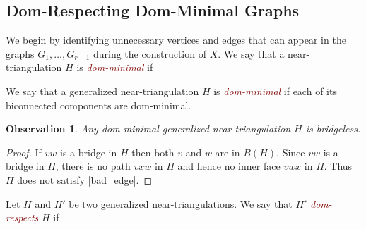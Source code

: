 \documentclass[a4paper,UKenglish,cleveref, autoref, thm-restate]{lipics-v2021}
\newtheorem{obs}{Observation}
\newcommand{\defin}[1]{\emph{\textcolor{Maroon}{#1}}}
\newcommand{\pat}[1]{[\textcolor{red}{PM: #1}]}
\newcommand{\saeed}[1]{[{\color{blue}SO: #1}]}
\begin{document}


\subsection{Dom-Respecting Dom-Minimal Graphs}

We begin by identifying unnecessary vertices and edges that can appear in the graphs $G_1,\ldots,G_{r-1}$ during the construction of $X$.   We say that a near-triangulation $H$ is \defin{dom-minimal} if
We say that a generalized near-triangulation $H$ is \defin{dom-minimal} if each of its biconnected components are dom-minimal.

\begin{obs}\label{bridgeless}
    Any dom-minimal generalized near-triangulation $H$ is bridgeless.
\end{obs}

\begin{proof}
   If $vw$ is a bridge in $H$ then both $v$ and $w$ are in $B(H)$.  Since $vw$ is a bridge in $H$, there is no path $vxw$ in $H$ and hence no inner face $vwx$ in $H$. Thus $H$ does not satisfy \cref{bad_edge}.
\end{proof}

Let $H$ and $H'$ be two generalized near-triangulations.  We say that $H'$ \defin{dom-respects} $H$ if
\end{document}
